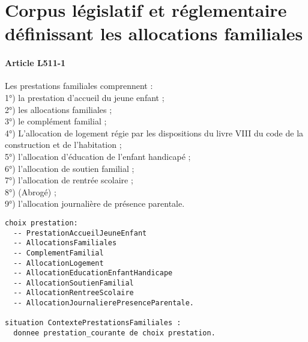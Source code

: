 \documentclass[11pt, french]{article}
\begin{document}
\section{Corpus législatif et réglementaire définissant les allocations familiales}

\paragraph{Article L511-1} Les prestations familiales comprennent :\\
1°) la prestation d'accueil du jeune enfant ;\\
2°) les allocations familiales ;\\
3°) le complément familial ;\\
4°) L'allocation de logement régie par les dispositions du livre VIII du code de la construction et de l'habitation ;\\
5°) l'allocation d'éducation de l'enfant handicapé ;\\
6°) l'allocation de soutien familial ;\\
7°) l'allocation de rentrée scolaire ;\\
8°) (Abrogé) ;\\
9°) l'allocation journalière de présence parentale.
\begin{lstlisting}
choix prestation:
  -- PrestationAccueilJeuneEnfant
  -- AllocationsFamiliales
  -- ComplementFamilial
  -- AllocationLogement
  -- AllocationEducationEnfantHandicape
  -- AllocationSoutienFamilial
  -- AllocationRentreeScolaire
  -- AllocationJournalierePresenceParentale.

situation ContextePrestationsFamiliales :
  donnee prestation_courante de choix prestation.
\end{lstlisting}
\end{document}
